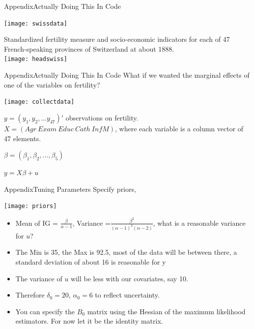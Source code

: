 \documentclass[table]{beamer}
\begin{document}
\begin{frame}{Appendix}{Actually Doing This In Code}
	\begin{description}
		\item	\texttt{[image: swissdata]}
		\item Standardized fertility measure and socio-economic indicators for each of 47 French-speaking provinces of Switzerland at about 1888. \\
		\texttt{[image: headswiss]}
		\item 
	\end{description}
\end{frame}

\begin{frame}{Appendix}{Actually Doing This In Code}
	What if we wanted the marginal effects of one of the variables on fertility? 
	\begin{description}
		\item \texttt{[image: collectdata]}
		\item $ y = (y_1, y_2, \dots  y_47)' $ observations on fertility. $ X = (
		Agr \ Exam  \ Educ  \ Cath \ InfM ) $, where each variable is a column vector of 47 elements. 
		\item $ \beta = (\beta_{1}, \beta_2, \dots, \beta_5) $
		\item $ y = X\beta + u $
	\end{description}
\end{frame}

\begin{frame}{Appendix}{Tuning Parameters}
	Specify priors, \\
	\begin{center}
		\texttt{[image: priors]}
	\end{center}
	\begin{itemize}
		\item Mean of IG = $ \frac{\beta}{\alpha - 1} $, Variance =$ \frac{\beta^2}{(\alpha-1)^2(\alpha-2)}  $, what is a reasonable variance for $ u $?
		\item The Min is 35, the Max is 92.5, most of the data will be between there, a standard deviation of about 16 is reasonable for y
		\item The variance of $ u $ will be less with our covariates, say 10. 
		\item Therefore $ \delta_0 = 20 $, $ \alpha_0 = 6 $ to reflect uncertainty. 
		\item You can specify the $ B_0 $ matrix using the Hessian of the maximum likelihood estimators. For now let it be the identity matrix. 
	\end{itemize}
\end{frame}
\end{document}
